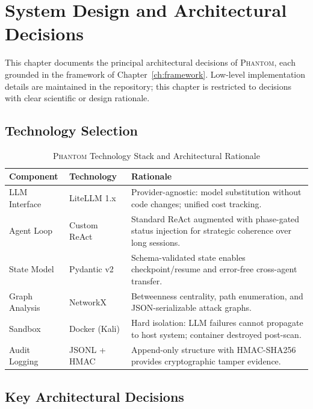 \documentclass[12pt,a4paper,oneside,openany]{book}
\newcommand{\Phantom}{\textsc{Phantom}}
\begin{document}
\chapter{System Design and Architectural Decisions}

This chapter documents the principal architectural decisions of \Phantom{}, each grounded in the framework of Chapter~\ref{ch:framework}. Low-level implementation details are maintained in the repository; this chapter is restricted to decisions with clear scientific or design rationale.

\section{Technology Selection}

\begin{table}[H]
\centering
\caption{\Phantom{} Technology Stack and Architectural Rationale}
\label{tab:tech_stack}
\begin{tabular}{p{2.5cm}p{2.5cm}p{7.5cm}}
\toprule
\textbf{Component} & \textbf{Technology} & \textbf{Rationale} \\
\midrule
LLM Interface & LiteLLM 1.x & Provider-agnostic: model substitution without code changes; unified cost tracking. \\
Agent Loop & Custom ReAct & Standard ReAct \cite{yao2022react} augmented with phase-gated status injection for strategic coherence over long sessions. \\
State Model & Pydantic v2 & Schema-validated state enables checkpoint/resume and error-free cross-agent transfer. \\
Graph Analysis & NetworkX & Betweenness centrality, path enumeration, and JSON-serializable attack graphs. \\
Sandbox & Docker (Kali) & Hard isolation: LLM failures cannot propagate to host system; container destroyed post-scan. \\
Audit Logging & JSONL + HMAC & Append-only structure with HMAC-SHA256 provides cryptographic tamper evidence. \\
\bottomrule
\end{tabular}
\end{table}

\section{Key Architectural Decisions}
\end{document}

